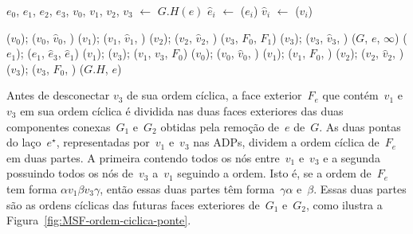\begin{algorithm}[hbt]
\caption{\MSFdelEdge($G$, $e$)}
\label{Algo:MSFdelEdge}
\begin{algorithmic}[1]
\State $e_0$, $e_1$, $e_2$, $e_3$, $v_0$, $v_1$, $v_2$, $v_3$ $\gets$ $G.H(e)$ \label{Algo:MSFdelEdge:linha:1}
\label{Algo:MSFdelEdge:linha:laco}
\State $\hat e_i$ $\gets$ \LCOFindNode($e_i$)
\State $\hat v_i$ $\gets$ \LCOFindNode($v_i$)
\EndFor

\label{Algo:MSFdelEdge:linha2}

\State \LCOCycle($v_0$); \LCOSplit($v_0$, $\hat v_0$, \Nil)\label{Algo:MSFdelEdge:linha3}
\State \LCOCycle($v_1$); \LCOSplit($v_1$, $\hat v_1$, \Nil)\label{Algo:MSFdelEdge:c1:v1}
\State \LCOCycle($v_2$); \LCOSplit($v_2$, $\hat v_2$, \Nil)\label{Algo:MSFdelEdge:c1:v2}
\State \LCOSplit($v_3$, $F_0$, $F_1$) \label{Algo:MSFdelEdge:c1:split}
\State \LCOCycle($v_3$); \LCOSplit($v_3$, $\hat v_3$, \Nil)\label{Algo:MSFdelEdge:linha12}
\Else{}
\State \MSFupdate($G$, $e$, $\infty$)\label{Algo:MSFdelEdge:linha:mudaPeso}
\State \LCOCycle($e_1$); \LCOSplit($e_1$, $\hat e_3$, $\hat e_1$) \label{Algo:MSFdelEdge:linha:split}
\State \LCOCycle($v_1$); \LCOCycle($v_3$); \LCOMerge($v_1$, $v_3$, $F_0$) \label{Algo:MSFdelEdge:linha:merge}
\State \LCOCycle($v_0$); \LCOSplit($v_0$, $\hat v_0$, \Nil) \label{Algo:MSFdelEdge:linha:1cs}
\State \LCOCycle($v_1$); \LCOSplit($v_1$, $F_0$, \Nil )
\State \LCOCycle($v_2$); \LCOSplit($v_2$, $\hat v_2$, \Nil)
\State \LCOCycle($v_3$); \LCOSplit($v_3$, $F_0$, \Nil)
	\label{Algo:MSFdelEdge:linha:ucs}
	\label{Algo:MSFdelEdge:linha:fim}
\EndIf
\State \LCODestroyOcto($G.H$, $e$)\label{Algo:MSFdelEdge:linha:desaloca}
\end{algorithmic}
\end{algorithm}

\newpage
Antes de desconectar $v_3$ de sua ordem cíclica, a face exterior~$F_e$ que contém~$v_1$ e~$v_3$ em sua ordem cíclica é dividida nas duas faces exteriores das duas componentes conexas~$G_1$ e~$G_2$ obtidas pela remoção de~$e$ de~$G$.
As duas pontas do laço~$e^\star$, representadas por~$v_1$ e~$v_3$ nas ADPs, dividem a ordem cíclica de~$F_e$ em duas partes.
A primeira contendo todos os nós entre~$v_1$ e~$v_3$ e a segunda possuindo todos os nós de~$v_3$ a~$v_1$ seguindo a ordem. 
Isto é, se a ordem de~$F_e$ tem forma $\alpha v_1\beta v_3\gamma$, então essas duas partes têm forma~$\gamma\alpha$ e~$\beta$.
Essas duas partes são as ordens cíclicas das futuras faces exteriores de~$G_1$ e~$G_2$, como ilustra a Figura~\ref{fig:MSF-ordem-ciclica-ponte}.

